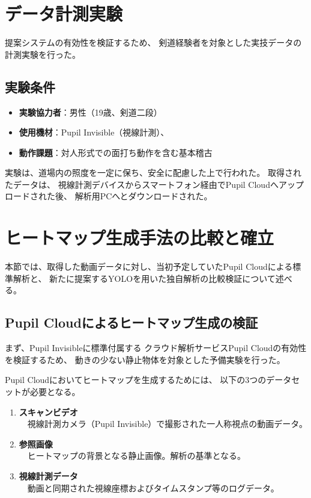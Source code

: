 \documentclass[dvipdfmx]{ujreport}
\begin{document}
\section{データ計測実験}
    提案システムの有効性を検証するため、
    剣道経験者を対象とした実技データの計測実験を行った。
    
    \subsection{実験条件}
    \begin{itemize}
        \item \textbf{実験協力者}：男性（19歳、剣道二段）
        \item \textbf{使用機材}：Pupil Invisible（視線計測）、
        \item \textbf{動作課題}：対人形式での面打ち動作を含む基本稽古
    \end{itemize}

    実験は、道場内の照度を一定に保ち、安全に配慮した上で行われた。
    取得されたデータは、
    視線計測デバイスからスマートフォン経由でPupil Cloudへアップロードされた後、
    解析用PCへとダウンロードされた。

\section{ヒートマップ生成手法の比較と確立}
    本節では、取得した動画データに対し、当初予定していたPupil Cloudによる標準解析と、
    新たに提案するYOLOを用いた独自解析の比較検証について述べる。

    \subsection{Pupil Cloudによるヒートマップ生成の検証}
    まず、Pupil Invisibleに標準付属する
    クラウド解析サービスPupil Cloudの有効性を検証するため、
    動きの少ない静止物体を対象とした予備実験を行った。
    
    Pupil Cloudにおいてヒートマップを生成するためには、
    以下の3つのデータセットが必要となる。
    \begin{enumerate}
        \item \textbf{スキャンビデオ}\\
        　視線計測カメラ（Pupil Invisible）で撮影された一人称視点の動画データ。
        \item \textbf{参照画像}\\
        　ヒートマップの背景となる静止画像。解析の基準となる。
        \item \textbf{視線計測データ}\\
        　動画と同期された視線座標およびタイムスタンプ等のログデータ。
    \end{enumerate}
\end{document}
